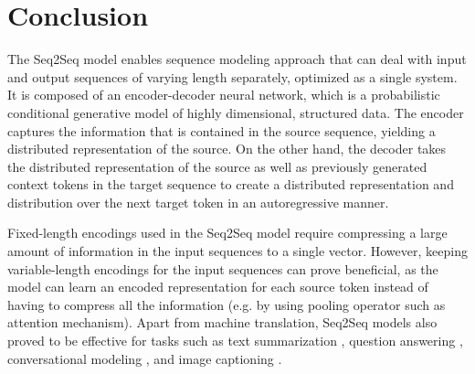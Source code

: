 \documentclass[12pt]{extarticle}
\begin{document}




\section*{Conclusion}
The Seq2Seq model enables sequence modeling approach that can deal with input and output sequences of varying length separately, optimized as a single system. It is composed of an encoder-decoder neural network, which is a probabilistic conditional generative model of highly dimensional, structured data. The encoder captures the information that is contained in the source sequence, yielding a distributed representation of the source. On the other hand, the decoder takes the distributed representation of the source as well as previously generated context tokens in the target sequence to create a distributed representation and distribution over the next target token in an autoregressive manner.

Fixed-length encodings used in the Seq2Seq model require compressing a large amount of information in the input sequences to a single vector. However, keeping variable-length encodings for the input sequences can prove beneficial, as the model can learn an encoded representation for each source token instead of having to compress all the information (e.g. by using pooling operator such as attention mechanism). Apart from machine translation, Seq2Seq models also proved to be effective for tasks such as text summarization \citep{nallapati-etal-2016-abstractive}, question answering \citep{yin-etal-2016-neural-generative}, conversational modeling \citep{DBLP:journals/corr/VinyalsL15}, and image captioning \citep{pmlr-v37-xuc15, show-and-tell}. 


\newpage

\end{document}
